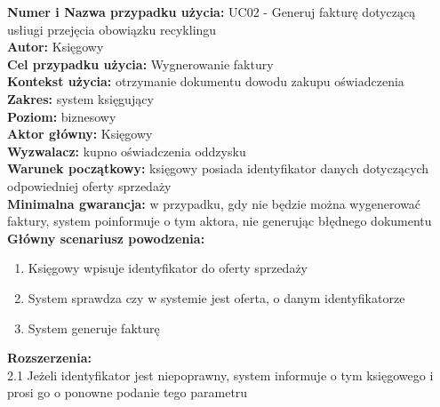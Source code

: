 \textbf{Numer i Nazwa przypadku użycia:} UC02 - Generuj fakturę dotyczącą usłiugi przejęcia obowiązku recyklingu \\
\textbf{Autor:} Księgowy\\
\textbf{Cel przypadku użycia:} Wygnerowanie faktury \\
\textbf{Kontekst użycia:} otrzymanie dokumentu dowodu zakupu oświadczenia  \\
\textbf{Zakres:} system księgujący \\
\textbf{Poziom:} biznesowy \\
\textbf{Aktor główny:} Księgowy \\
\textbf{Wyzwalacz:} kupno oświadczenia oddzysku \\
\textbf{Warunek początkowy:} księgowy posiada identyfikator danych dotyczących odpowiedniej oferty sprzedaży \\
\textbf{Minimalna gwarancja:} w przypadku, gdy nie będzie można wygenerować faktury, system poinformuje o tym aktora, nie generując błędnego dokumentu \\
\textbf{Główny scenariusz powodzenia:} 
	\begin{enumerate}
		\item Księgowy wpisuje identyfikator do oferty sprzedaży
		\item System sprawdza czy w systemie jest oferta, o danym identyfikatorze
		\item System generuje fakturę 
	\end{enumerate}
\textbf{Rozszerzenia:} \\
2.1 Jeżeli identyfikator jest niepoprawny, system informuje o tym księgowego i prosi go o ponowne podanie tego parametru

